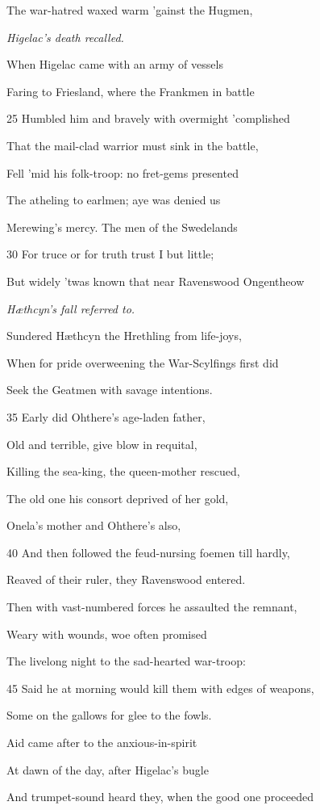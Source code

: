 The war-hatred waxed warm ’gainst the Hugmen,

\emph{Higelac’s death
recalled.}

When Higelac came with an army of vessels

Faring to Friesland, where the Frankmen in battle

25
Humbled him and bravely with overmight ’complished

That the mail-clad warrior must sink in the battle,

Fell ’mid his folk-troop: no fret-gems presented

The atheling to earlmen; aye was denied us

Merewing’s mercy. The men of the Swedelands

30
For truce or for truth trust I but little;

But widely ’twas known that near Ravenswood Ongentheow

\emph{Hæthcyn’s fall
referred to.}

Sundered Hæthcyn the Hrethling from life-joys,

When for pride overweening the War-Scylfings first did

Seek the Geatmen with savage intentions.

35
Early did Ohthere’s age-laden father,

Old and terrible, give blow in requital,

Killing the sea-king, the queen-mother rescued,

The old one his consort deprived of her gold,

Onela’s mother and Ohthere’s also,

40
And then followed the feud-nursing foemen till hardly,

Reaved of their ruler, they Ravenswood entered.

Then with vast-numbered forces he assaulted the remnant,

Weary with wounds, woe often promised

The livelong night to the sad-hearted war-troop:

45
Said he at morning would kill them with edges of weapons,

Some on the gallows for glee to the fowls.

Aid came after to the anxious-in-spirit

At dawn of the day, after Higelac’s bugle

And trumpet-sound heard they, when the good one proceeded

